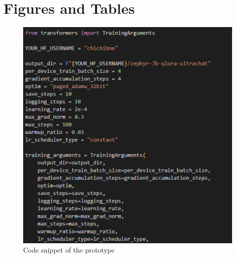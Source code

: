 %
%
%                 

\chapter{Figures and Tables}
\label{sec:appendixa}



%

\begin{figure}
	\caption{Code snippet of the prototype}
	\centering
	\includegraphics{figures/qlora-snippet}
\end{figure}

